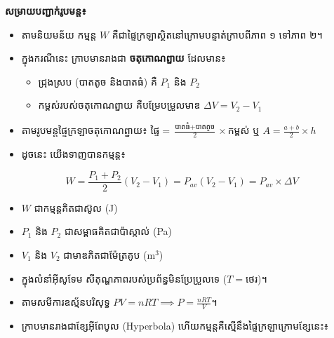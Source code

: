 \textbf{សម្រាយបញ្ជាក់រូបមន្ត៖}
\begin{itemize}
	\item តាមនិយមន័យ កម្មន្ត $W$ គឺជាផ្ទៃក្រឡាស្ថិតនៅក្រោមបន្ទាត់ក្រាបពីភាព ១ ទៅភាព ២។
	\item ក្នុងករណីនេះ ក្រាបមានរាងជា \textbf{ចតុកោណព្នាយ} ដែលមាន៖
	\begin{itemize}
		\item ជ្រុងស្រប (បាតតូច និងបាតធំ) គឺ $P_1$ និង $P_2$
		\item កម្ពស់របស់ចតុកោណព្នាយ គឺបម្រែបម្រួលមាឌ $\Delta V = V_2 - V_1$
	\end{itemize}
	\item តាមរូបមន្តផ្ទៃក្រឡាចតុកោណព្នាយ៖ $\mbox{ផ្ទៃ} = \frac{\mbox{បាតធំ} + \mbox{បាតតូច}}{2} \times \mbox{កម្ពស់}$ ឬ $A = \frac{a+b}{2}\times h$
	\item ដូចនេះ យើងទាញបានកម្មន្ត៖
\end{itemize}
\begin{equation}
	W = \frac{P_1 + P_2}{2} (V_2 - V_1) = P_{av}(V_2-V_1) = P_{av} \times \Delta V
\end{equation}
\begin{itemize}
	\item $W$ ជាកម្មន្តគិតជាស៊ូល (J)
	\item $P_1$ និង $P_2$ ជាសម្ពាធគិតជាប៉ាស្កាល់ (Pa)
	\item $V_1$ និង $V_2$ ជាមាឌគិតជាម៉ែត្រគូប ($\mathrm{m}^3$)
\end{itemize}
	
\begin{itemize}
	\item ក្នុងលំនាំអ៊ីសូទែម សីតុណ្ហភាពរបស់ប្រព័ន្ធមិនប្រែប្រួលទេ ($T = \mbox{ថេរ}$)។
	\item តាមសមីការឧស្ម័នបរិសុទ្ធ $PV = nRT \implies P = \frac{nRT}{V}$។
	\item ក្រាបមានរាងជាខ្សែអុីពែបូល (Hyperbola) ហើយកម្មន្តគឺស្មើនឹងផ្ទៃក្រឡាក្រោមខ្សែនេះ៖
\end{itemize}

